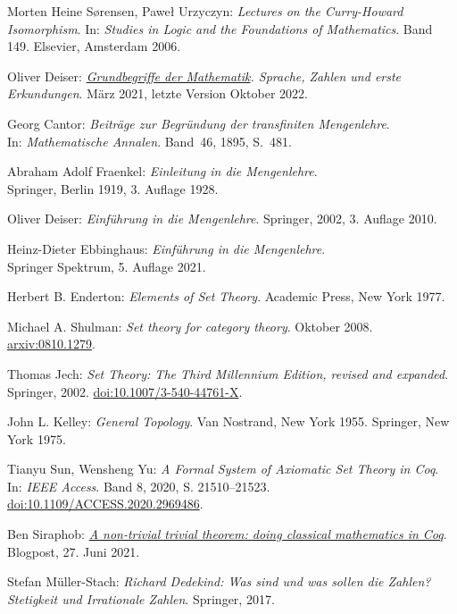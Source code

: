 \begin{thebibliography}{00}
 Morten Heine Sørensen, Paweł Urzyczyn:
\emph{Lectures on the Curry-Howard Isomorphism}.
In: \emph{Studies in Logic and the Foundations of Mathematics}.
Band 149. Elsevier, Amsterdam 2006.

Oliver Deiser:
\emph{\href{https://www.aleph1.info/?call=Puc&permalink=grundbegriffe}%
{Grundbegriffe der Mathematik}. Sprache, Zahlen und erste
Erkundungen}. März 2021, letzte Version Oktober 2022.

 Georg Cantor:
\emph{Beiträge zur Begründung der transfiniten Mengenlehre}.\\
In: \emph{Mathematische Annalen}. Band~46, 1895, S.~481.

 Abraham Adolf Fraenkel:
\emph{Einleitung in die Mengenlehre}.\\
Springer, Berlin 1919, 3. Auflage 1928.

 Oliver Deiser:
\emph{Einführung in die Mengenlehre}.
Springer, 2002, 3. Auflage 2010.

 Heinz-Dieter Ebbinghaus:
\emph{Einführung in die Mengenlehre}.\\
Springer Spektrum, 5. Auflage 2021.

 Herbert B. Enderton:
\emph{Elements of Set Theory}. Academic Press, New York 1977.

 Michael A. Shulman:
\emph{Set theory for category theory}.
Oktober 2008.\\
\href{https://arxiv.org/abs/0810.1279}{arxiv:0810.1279}.

 Thomas Jech: \emph{Set Theory: The Third Millennium
Edition, revised and expanded}. Springer, 2002.
\href{https://doi.org/10.1007/3-540-44761-X}{doi:10.1007/3-540-44761-X}.

 John L. Kelley: \emph{General Topology}. Van Nostrand,
New York 1955. Springer, New York 1975.

 Tianyu Sun, Wensheng Yu:
\emph{A Formal System of Axiomatic Set Theory in Coq}. In:
\emph{IEEE Access}. Band 8, 2020, S. 21510--21523.
\href{https://doi.org/10.1109/ACCESS.2020.2969486}{doi:10.1109/ACCESS.2020.2969486}.

 Ben Siraphob:
\href{https://siraben.dev/2021/06/27/classical-math-coq.html}{%
\emph{A non-trivial trivial theorem: doing classical mathematics in Coq}}.
Blogpost, 27. Juni 2021.

 Stefan Müller-Stach:
\emph{Richard Dedekind: Was sind und was sollen die Zahlen?
Stetigkeit und Irrationale Zahlen}. Springer, 2017.


\end{thebibliography}
